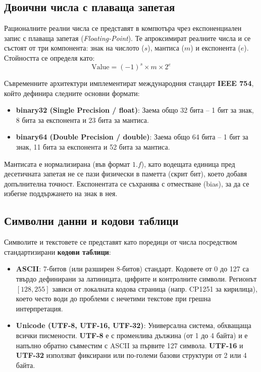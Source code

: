 \documentclass{scrartcl}
\begin{document}
\begin{FlushLeft}
\subsection{Двоични числа с плаваща запетая} 
Рационалните реални числа се представят в компютъра чрез експоненциален запис с плаваща запетая (\textit{Floating-Point}). Те апроксимират реалните числа и се състоят от три компонента: знак на числото ($s$), мантиса ($m$) и експонента ($e$). Стойността се определя като:
\[ \text{Value} = (-1)^s \times m \times 2^e \] 

Съвременните архитектури имплементират международния стандарт \textbf{IEEE 754}, който дефинира следните основни формати:
\begin{itemize}
    \item \textbf{binary32 (Single Precision / float)}: Заема общо 32 бита – 1 бит за знак, 8 бита за експонента и 23 бита за мантиса.
    \item \textbf{binary64 (Double Precision / double)}: Заема общо 64 бита – 1 бит за знак, 11 бита за експонента и 52 бита за мантиса.
\end{itemize}
Мантисата е нормализирана (във формат $1.f$), като водещата единица пред десетичната запетая не се пази физически в паметта (скрит бит), което добавя допълнителна точност. Експонентата се съхранява с отместване (bias), за да се избегне поддържането на знак в нея.

\subsection{Символни данни и кодови таблици} 
Символите и текстовете се представят като поредици от числа посредством стандартизирани \textbf{кодови таблици}:
\begin{itemize}
    \item \textbf{ASCII}: 7-битов (или разширен 8-битов) стандарт. Кодовете от 0 до 127 са твърдо дефинирани за латиницата, цифрите и контролните символи. Регионът $[128, 255]$ зависи от локалната кодова страница (напр. CP1251 за кирилица), което често води до проблеми с нечетими текстове при грешна интерпретация.
    \item \textbf{Unicode (UTF-8, UTF-16, UTF-32)}: Универсална система, обхващаща всички писмености. \textbf{UTF-8} е с променлива дължина (от 1 до 4 байта) и е напълно обратно съвместим с ASCII за първите 127 символа. \textbf{UTF-16} и \textbf{UTF-32} използват фиксирани или по-големи базови структури от 2 или 4 байта.
\end{itemize}


\end{FlushLeft}
\end{document}
